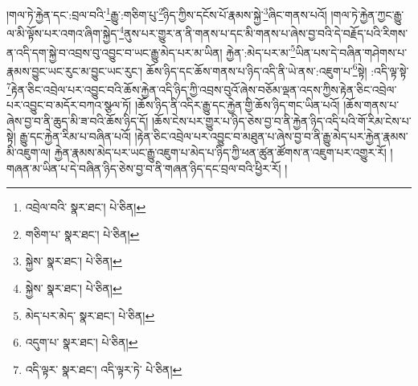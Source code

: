།གལ་ཏེ་རྐྱེན་དང་:བྲལ་བའི་\footnote{འབྲེལ་བའི་  སྣར་ཐང་།  པེ་ཅིན། }རྒྱུ་:གཅིག་པུ་\footnote{གཅིག་པ་  སྣར་ཐང་།  པེ་ཅིན། }ཉིད་ཀྱིས་དངོས་པོ་རྣམས་སྐྱེ་\footnote{སྐྱེས་  སྣར་ཐང་།  པེ་ཅིན། }ཞིང་གནས་པའོ། །གལ་ཏེ་རྐྱེན་ཀྱང་རྒྱུ་ལ་མི་ལྟོས་པར་འགའ་ཞིག་སྐྱེད་\footnote{སྐྱེས་  སྣར་ཐང་།  པེ་ཅིན། }ནུས་པར་གྱུར་ན་ནི་གནས་པ་དང་མི་གནས་པ་ཞེས་བྱ་བའི་དེ་བརྗོད་པའི་རིགས་ན་འདི་དག་སྐྱེ་བ་འབྲས་བུ་འབྱུང་བ་ཡང་རྒྱུ་མེད་པར་མ་ཡིན། རྐྱེན་:མེད་པར་མ་\footnote{མེད་པར་མེད་  སྣར་ཐང་།  པེ་ཅིན། }ཡིན་པས་དེ་བཞིན་གཤེགས་པ་རྣམས་བྱུང་ཡང་རུང་མ་བྱུང་ཡང་རུང་། ཆོས་ཉིད་དང་ཆོས་གནས་པ་ཉིད་འདི་ནི་ཡེ་ནས་:འཇུག་པ་\footnote{འདུག་པ་  སྣར་ཐང་།  པེ་ཅིན། }སྟེ། :འདི་ལྟ་སྟེ་\footnote{འདི་ལྟར་  སྣར་ཐང་། འདི་ལྟར་ཏེ་  པེ་ཅིན། }རྟེན་ཅིང་འབྲེལ་པར་འབྱུང་བའི་ཆོས་རྐྱེན་འདི་ཉིད་ཀྱི་འབྲས་བུའོ་ཞེས་བཅོམ་ལྡན་འདས་ཀྱིས་རྟེན་ཅིང་འབྲེལ་པར་འབྱུང་བ་མདོར་བཀའ་སྩལ་ཏོ། །ཆོས་ཉིད་ནི་འདིར་རྒྱུ་དང་རྐྱེན་གྱི་ཆོས་ཉིད་གང་ཡིན་པའོ། །ཆོས་གནས་པ་ཞེས་བྱ་བ་ནི་ཆུད་མི་ཟ་བའི་ཆོས་ཉིད་དོ། །ཆོས་ངེས་པར་གྱུར་པ་ཉིད་ཅེས་བྱ་བ་ནི་རྐྱེན་ཉིད་འདི་པའི་གོ་རིམ་ངེས་པ་སྟེ། རྒྱུ་དང་རྐྱེན་རིམ་པ་བཞིན་པའོ། །རྟེན་ཅིང་འབྲེལ་པར་འབྱུང་བ་མཐུན་པ་ཞེས་བྱ་བ་ནི་རྒྱུ་མེད་པར་རྐྱེན་རྣམས་མི་འཇུག་ལ། རྐྱེན་རྣམས་མེད་པར་ཡང་རྒྱུ་འཇུག་པ་མེད་པ་ཉིད་ཀྱི་ཕན་ཚུན་ཚོགས་ན་འཇུག་པར་འགྱུར་རོ། །གཞན་མ་ཡིན་པ་དེ་བཞིན་ཉིད་ཅེས་བྱ་བ་ནི་གཞན་ཉིད་དང་བྲལ་བའི་ཕྱིར་རོ། །
